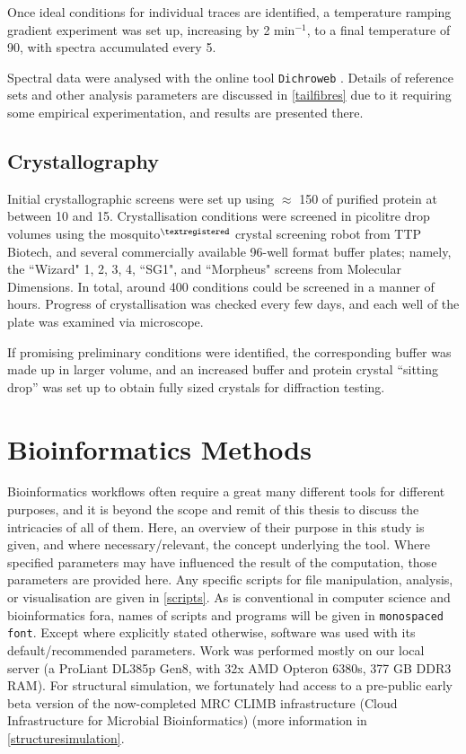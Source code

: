 Once ideal conditions for individual traces are identified, a temperature ramping gradient experiment was set up, increasing by 2\degC{} min$^{-1}$, to a final temperature of 90\degC, with spectra accumulated every 5\degC.

Spectral data were analysed with the online tool \texttt{Dichroweb} \citep{Whitmore2004}. Details of reference sets and other analysis parameters are discussed in \vref{tailfibres} due to it requiring some empirical experimentation, and results are presented there.

\subsection{Crystallography}
Initial crystallographic screens were set up using $\approx$ 150\ul{} of purified protein at between 10 and 15\mgml. Crystallisation conditions were screened in picolitre drop volumes using the mosquito$^{\textregistered}$ crystal screening robot from TTP Biotech, and several commercially available 96-well format buffer plates; namely, the ``Wizard" 1, 2, 3, 4, ``SG1", and ``Morpheus" screens from Molecular Dimensions. In total, around 400 conditions could be screened in a manner of hours. Progress of crystallisation was checked every few days, and each well of the plate was examined via microscope.

If promising preliminary conditions were identified, the corresponding buffer was made up in larger volume, and an increased buffer and protein crystal ``sitting drop'' was set up to obtain fully sized crystals for diffraction testing.

\section{Bioinformatics Methods}
Bioinformatics workflows often require a great many different tools for different purposes, and it is beyond the scope and remit of this thesis to discuss the intricacies of all of them. Here, an overview of their purpose in this study is given, and where necessary/relevant, the concept underlying the tool. Where specified parameters may have influenced the result of the computation, those parameters are provided here. Any specific scripts for file manipulation, analysis, or visualisation are given in \vref{scripts}. As is conventional in computer science and bioinformatics fora, names of scripts and programs will be given in \texttt{monospaced font}. Except where explicitly stated otherwise, software was used with its default/recommended parameters. Work was performed mostly on our local server (a ProLiant DL385p Gen8, with 32x AMD Opteron 6380s, 377 GB DDR3 RAM). For structural simulation, we fortunately had access to a pre-public early beta version of the now-completed MRC CLIMB infrastructure (Cloud Infrastructure for Microbial Bioinformatics)\citep{Connor2016a} (more information in \vref{structuresimulation}.

